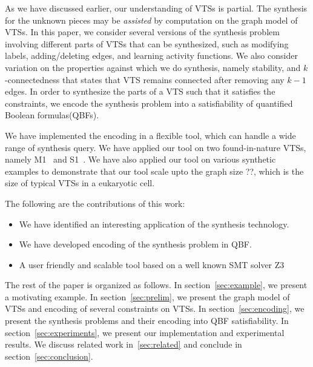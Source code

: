 %
As we have discussed earlier, our understanding of VTSs is partial.
%
%
%
%
The synthesis for the unknown pieces may be {\em assisted} by computation on
the graph model of VTSs.
%
In this paper, we consider several versions of the synthesis problem
involving different parts of VTSs that can be synthesized, such as
modifying labels, adding/deleting edges, and learning activity functions.
%
We also consider variation on the properties against which we do
synthesis, namely stability, and $k$-connectedness that states that
VTS remains connected after removing any $k-1$ edges.
%
In order to synthesize the parts of a VTS such that it satisfies the
constraints, we encode the synthesis problem into a satisfiability of
quantified Boolean formulas(QBFs). 
%

We have implemented the encoding in a flexible tool,
which can handle a wide range of synthesis query.
%
We have applied our tool on two found-in-nature VTSs, namely
M1~\cite{} and S1~\cite{burri2004complete}.
%
We have also applied our tool on various synthetic examples to
demonstrate that our tool scale upto the graph size ??, which
is the size of typical VTSs in a eukaryotic cell.

The following are the contributions of this work:
\begin{itemize}
\item We have identified an interesting application of
  the synthesis technology.
\item We have developed encoding of the synthesis problem in QBF.
\item A user friendly and scalable tool based on a well known SMT solver Z3
\end{itemize}

The rest of the paper is organized as follows.
%
In section~\ref{sec:example}, we present a motivating example.
%
In section~\ref{sec:prelim}, we present the graph model of VTSs and encoding of several
constraints on VTSs.
%
In section~\ref{sec:encoding}, we present the synthesis problems and their
encoding into QBF satisfiability.
%
In section~\ref{sec:experiments}, we present our implementation and experimental results.
%
We discuss related work in~\ref{sec:related} and conclude in section~\ref{sec:conclusion}.



